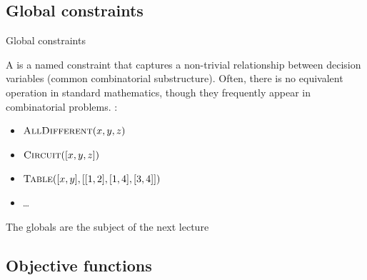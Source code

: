 \documentclass{cons-beamer}
\begin{document}
\subsection{Global constraints}

\begin{frame}{Global constraints}

A  is a named constraint that captures a non-trivial relationship between decision variables (common combinatorial substructure).
Often, there is no equivalent operation in standard mathematics, though they frequently appear in combinatorial problems. \Eg:

\parBreak

  \begin{itemize}
	  \item $\textsc{AllDifferent}(x, y, z)$
	  \item $\textsc{Circuit}([x,y,z])$
	  \item $\textsc{Table}([x,y], [[1,2],[1,4],[3,4]])$
	    \item \ldots
  \end{itemize}

  \vfill
	\centering
	The globals are the subject of the next lecture

\end{frame}


\subsection{Objective functions}
\end{document}
